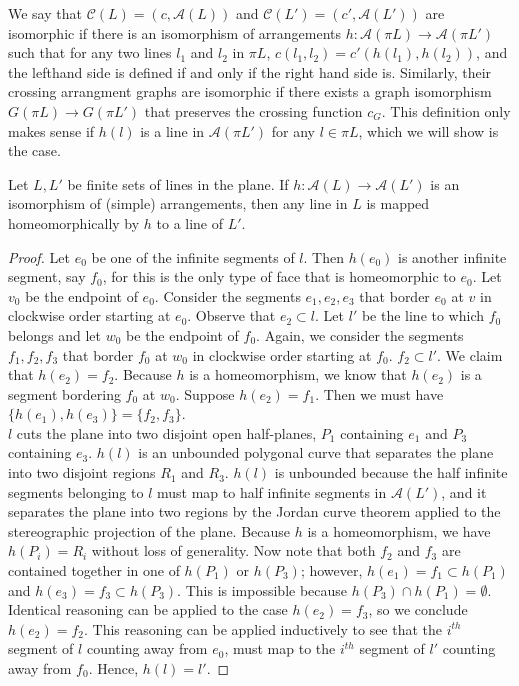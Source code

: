 \documentclass[11pt, oneside]{article}
\begin{document}
We say that $\mathcal{C}(L) = (c, \mathcal{A}(L))$ and $\mathcal{C}(L')  = (c', \mathcal{A}(L'))$ are isomorphic if there is an isomorphism of arrangements $h:\mathcal{A }(\pi L) \to \mathcal{A} (\pi L')$ such that for any two lines $l_1$ and $l_2$ in $\pi L$, $c(l_1, l_2) = c'(h(l_1), h(l_2))$, and the lefthand side is defined if and only if the right hand side is. 
Similarly, their crossing arrangment graphs are isomorphic if there exists a graph isomorphism $G( \pi L) \to G( \pi L')$ that preserves the crossing function $c_G$. This definition only makes sense if $h(l)$ is a line in $\mathcal{A}(\pi L')$ for any $l \in \pi L$, which we will show is the case. 
 \begin{lem}
Let $L, L'$ be finite sets of lines in the plane. If $h: \mathcal{A}(L) \to \mathcal{A}(L')$ is an isomorphism of (simple) arrangements, then any line in $L$ is mapped homeomorphically by $h$ to a line of $L'$. 
 \end{lem}
\begin{proof}
Let $e_0$ be one of the infinite segments of $l$. Then $h(e_0)$ is another infinite segment, say $f_0$, for this is the only type of face that is homeomorphic to $e_0$. Let $v_0$ be the endpoint of $e_0$. 
Consider the segments $e_1, e_2, e_3$ that border $e_0$ at $v$ in clockwise order starting at $e_0$. Observe that $e_2 \subset l$. Let $l'$ be the line to which $f_0$ belongs and let $w_0$ be the endpoint of $f_0$. Again, we consider the segments $f_1, f_2, f_3$ that border $f_0$ at $w_0$ in clockwise order starting at $f_0$. $f_2 \subset l'$. We claim that $h(e_2) = f_2$. 
Because $h$ is a homeomorphism, we know that $h(e_2)$ is a segment bordering $f_0$ at $w_0$. Suppose $h(e_2) = f_1$. Then we must have $\{h(e_1),h(e_3)\} = \{f_2, f_3\}$. \\

 $l$ cuts the plane into two disjoint open half-planes, $P_1$ containing $e_1$ and $P_3$ containing $e_3$. $h(l)$ is an unbounded polygonal curve that separates the plane into two disjoint regions $R_1$ and $R_3$. 
 $h(l)$ is unbounded because the half infinite segments belonging to $l$ must map to half infinite segments in $\mathcal{A}(L')$, and it separates the plane into two regions by the Jordan curve theorem applied to the stereographic projection of the plane. 
 Because $h$ is a homeomorphism, we have $h(P_i) = R_i$ without loss of generality. Now note that both $f_2$ and $f_3$ are contained together in one of $h(P_1)$ or $h(P_3)$; however, $h(e_1) =f_1\subset h(P_1)$ and $h(e_3) = f_3 \subset h(P_3)$. This is impossible because $h(P_3) \cap h(P_1) = \emptyset$. \\
 
 Identical reasoning can be applied to the case $h(e_2) = f_3$, so we conclude $h(e_2) = f_2$. This reasoning can be applied inductively to see that the $i^{th}$ segment of $l$ counting away from $e_0$, must map to the $i^{th}$ segment of $l'$ counting away from $f_0$. Hence, $h(l) = l'$. 
 \end{proof}
 
\end{document}
